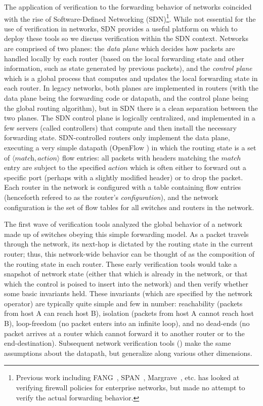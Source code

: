 The application of verification to the forwarding behavior of networks coincided with the rise of Software-Defined Networking (SDN)\footnote{Previous work including FANG~\cite{mayer2000fang}, SPAN~\cite{gupta2009span}, Margrave~\cite{nelson2010margrave}, etc. has looked at verifying firewall policies for enterprise networks, but made no attempt to verify the actual forwarding behavior.}. While not essential for the use of verification in networks, SDN provides a useful platform on which to deploy these tools so we discuss verification within the SDN context. Networks are comprised of two planes: the {\em data plane} which decides how packets are handled locally by each router (based on the local forwarding state and other information, such as state generated by previous packets), and the {\em control plane} which is a global process that computes and updates the local forwarding state in each router. In legacy networks, both planes are implemented in routers (with the data plane being the forwarding code or datapath, and the control plane being the global routing algorithm), but in SDN there is a clean separation between the two planes. The SDN control plane is logically centralized, and implemented in a few servers (called controllers) that compute and then install the necessary forwarding state. SDN-controlled routers only implement the data plane, executing a very simple datapath (OpenFlow \cite{openflow}) in which the routing state is a set of $\langle \textit{match}, \textit{action} \rangle$ flow entries: all packets with headers matching the $match$ entry are subject to the specified $action$ which is often either to forward out a specific port (perhaps with a slightly modified header) or to drop the packet. Each router in the network is configured with a table containing flow entries (henceforth refered to as the router's {\em configuration}), and the network configuration is the set of flow tables for all switches and routers in the network.


The first wave of verification tools \cite{anteater,khurshid2012veriflow,oldhsa,kazemian2013real} analyzed the global behavior of a network made up of switches obeying this simple forwarding model. As a packet travels through the network, its next-hop is dictated by the routing state in the current router; thus, this network-wide behavior can be thought of as the composition of the routing state in each router. These early verification tools would take a snapshot of network state (either that which is already in the network, or that which the control is poised to insert into the network) and then verify whether some basic invariants held. These invariants (which are specified by the network operator) are typically quite simple and few in number: reachability (\eg packets from host A can reach host B), isolation (\eg packets from host A cannot reach host B), loop-freedom (no packet enters into an infinite loop), and no dead-ends (no packet arrives at a router which cannot forward it to another router or to the end-destination). Subsequent network verification tools (\eg \cite{guha2013machine,anderson2014netkat,flowlog, nelson2013balance}) make the same assumptions about the datapath, but generalize along various other dimensions.


